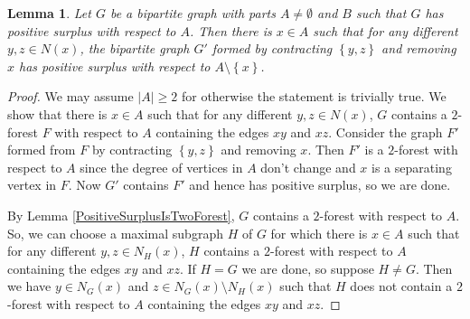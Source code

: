 \documentclass[12pt]{article}
\theoremstyle{plain}
\newtheorem{lem}[thm]{Lemma}
\theoremstyle{definition}
\theoremstyle{remark}
\newcommand{\set}[1]{\left\{ #1 \right\}}
\begin{document}
\begin{lem}\label{BipartiteLemma}
Let $G$ be a bipartite graph with parts $A \ne \emptyset$ and $B$ such that $G$ has positive surplus with respect to $A$.   Then there is $x \in A$ such that for any different $y,z \in N(x)$, the bipartite graph $G'$ formed by contracting $\set{y,z}$ and removing $x$ has positive surplus with respect to $A \setminus \set{x}$.
\end{lem}
\begin{proof}
We may assume $|A| \ge 2$ for otherwise the statement is trivially true. We show that there is $x \in A$ such that for any different $y,z \in N(x)$, $G$ contains a $2$-forest $F$ with respect to $A$ containing the edges $xy$ and $xz$.  Consider the graph $F'$ formed from $F$ by contracting $\set{y,z}$ and removing $x$.  Then $F'$ is a $2$-forest with respect to $A$ since the degree of vertices in $A$ don't change and $x$ is a separating vertex in $F$.  Now $G'$ contains $F'$ and hence has positive surplus, so we are done.

By Lemma \ref{PositiveSurplusIsTwoForest}, $G$ contains a $2$-forest with respect to $A$.  So, we can choose a maximal subgraph $H$ of $G$ for which there is $x \in A$ such that for any different $y,z \in N_H(x)$, $H$ contains a $2$-forest with respect to $A$ containing the edges $xy$ and $xz$.  If $H=G$ we are done, so suppose $H \ne G$.  Then we have $y \in N_G(x)$ and $z \in N_G(x) \setminus N_H(x)$ such that $H$ does not contain a $2$-forest with respect to $A$ containing the edges $xy$ and $xz$.
\end{proof}
\end{document}
